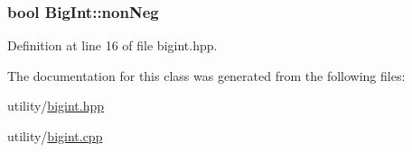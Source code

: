 \hypertarget{class_big_int_afc36eaf290d1b537127ba9f651b5db86}{}
\subsubsection[{non\+Neg}]{\setlength{\rightskip}{0pt plus 5cm}bool Big\+Int\+::non\+Neg\hspace{0.3cm}{\ttfamily [private]}}\label{class_big_int_afc36eaf290d1b537127ba9f651b5db86}


Definition at line 16 of file bigint.\+hpp.



The documentation for this class was generated from the following files\+:\begin{DoxyCompactItemize}
\item 
utility/\hyperlink{bigint_8hpp}{bigint.\+hpp}\item 
utility/\hyperlink{bigint_8cpp}{bigint.\+cpp}\end{DoxyCompactItemize}
